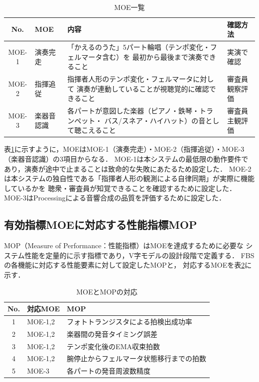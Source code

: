 \documentclass[lualatex,book,paper=a4paper,jafontsize=11.5pt,jafontscale=1.05,oneside]{jlreq}
\begin{document}
\begin{table}[H]
  \centering
  \caption{MOE一覧}
  \label{tab:moe}
  \begin{tabularx}{\linewidth}{clXl}
    \toprule
    No. & MOE & 内容 & 確認方法 \\
    \midrule
    MOE-1 & 演奏完走 &
      「かえるのうた」5パート輪唱（テンポ変化・フェルマータ含む）を
      最初から最後まで演奏できること &
      実演で確認 \\
    MOE-2 & 指揮追従 &
      指揮者人形のテンポ変化・フェルマータに対して
      演奏が連動していることが視聴覚的に確認できること &
      審査員観察評価 \\
    MOE-3 & 楽器音認識 &
      各パートが意図した楽器（ピアノ・鉄琴・トランペット・
      バス/スネア・ハイハット）の音として聴こえること &
      審査員主観評価 \\
    \bottomrule
  \end{tabularx}
\end{table}

表\ref{tab:moe}に示すように，MOEはMOE-1（演奏完走）・MOE-2（指揮追従）・MOE-3（楽器音認識）の3項目からなる．
MOE-1は本システムの最低限の動作要件であり，演奏が途中で止まることは致命的な失敗にあたるため設定した．
MOE-2は本システムの独自性である「指揮者人形の観測による自律同期」が実際に機能しているかを
聴衆・審査員が知覚できることを確認するために設定した．
MOE-3はProcessingによる音響合成の品質を評価するために設定した．

\subsection{有効指標MOEに対応する性能指標MOP}

MOP（Measure of Performance：性能指標）はMOEを達成するために必要な
システム性能を定量的に示す指標であり，V字モデルの設計段階で定義する．
FBSの各機能に対応する性能要素に対して設定したMOPと，
対応するMOEを表\ref{tab:moe-mop}に示す．

\begin{table}[H]
  \centering
  \caption{MOEとMOPの対応}
  \label{tab:moe-mop}
  \begin{tabularx}{\linewidth}{clX}
    \toprule
    No. & 対応MOE & MOP \\
    \midrule
    1 & MOE-1,2 & フォトトランジスタによる拍検出成功率 \\
    2 & MOE-1,2 & 楽器間の発音タイミング誤差 \\
    3 & MOE-1,2 & テンポ変化後のEMA収束拍数 \\
    4 & MOE-1,2 & 腕停止からフェルマータ状態移行までの拍数 \\
    5 & MOE-3   & 各パートの発音周波数精度 \\
    \bottomrule
  \end{tabularx}
\end{table}
\end{document}
